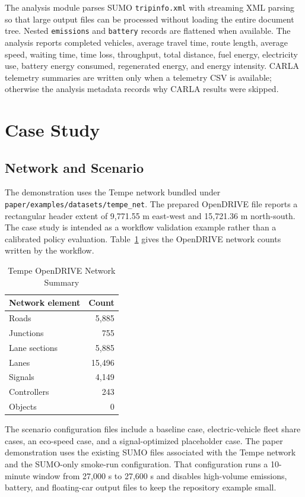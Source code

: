 \documentclass[10pt,numbered]{\selectedmanuscriptclass}
\begin{document}
The analysis module parses SUMO \texttt{tripinfo.xml} with streaming XML parsing
so that large output files can be processed without loading the entire document
tree. Nested \texttt{emissions} and \texttt{battery} records are flattened when
available. The analysis reports completed vehicles, average travel time, route
length, average speed, waiting time, time loss, throughput, total distance, fuel
energy, electricity use, battery energy consumed, regenerated energy, and energy
intensity. CARLA telemetry summaries are written only when a telemetry CSV is
available; otherwise the analysis metadata records why CARLA results were
skipped.

\section{Case Study}\label{sec:case-study}

\subsection{Network and Scenario}

The demonstration uses the Tempe network bundled under
\texttt{paper/examples/datasets/tempe\_net}. The prepared OpenDRIVE file reports
a rectangular header extent of 9,771.55 m east-west and 15,721.36 m north-south.
The case study is intended as a workflow validation example rather than a
calibrated policy evaluation. Table~\ref{tab:network-summary} gives the
OpenDRIVE network counts written by the workflow.

\begin{table}[htbp]
  \caption{Tempe OpenDRIVE Network Summary}
  \label{tab:network-summary}
  \centering
  \begin{tabular}{lr}
    \hline
    Network element & Count \\
    \hline
    Roads & 5,885 \\
    Junctions & 755 \\
    Lane sections & 5,885 \\
    Lanes & 15,496 \\
    Signals & 4,149 \\
    Controllers & 243 \\
    Objects & 0 \\
    \hline
  \end{tabular}
\end{table}

The scenario configuration files include a baseline case, electric-vehicle fleet
share cases, an eco-speed case, and a signal-optimized placeholder case. The
paper demonstration uses the existing SUMO files associated with the Tempe
network and the SUMO-only smoke-run configuration. That configuration runs a
10-minute window from 27,000 s to 27,600 s and disables high-volume emissions,
battery, and floating-car output files to keep the repository example small.
\end{document}
